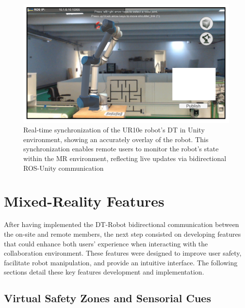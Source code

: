 \begin{figure}[h]
    \centering
    \includegraphics[width=\linewidth]{figs/super-imposed-robot.png}
    \caption{Real-time synchronization of the UR10e robot’s \ac{DT} in Unity environment, showing an accurately overlay of the robot. This synchronization enables remote users to monitor the robot's state within the \ac{MR} environment, reflecting live updates via bidirectional \ac{ROS}-Unity communication}
    \label{fig:robot-unity}
\end{figure}


\section{Mixed-Reality Features}
\label{section:on-site-features}
After having implemented the \ac{DT}-Robot bidirectional communication between the on-site and remote members, the next step consisted on developing features that could enhance both users' experience when interacting with the collaboration environment. These features were designed to improve user safety, facilitate robot manipulation, and provide an intuitive interface. The following sections detail these key features development and implementation.


\subsection{Virtual Safety Zones and Sensorial Cues}
\label{subsection:virtual-safety-zones} 

